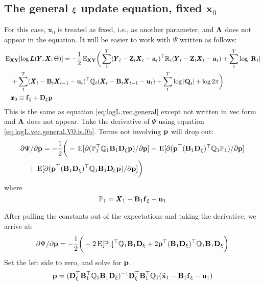 \documentclass[]{article}
\def\xixi{\mbox{\boldmath $\xi$}}
\def\LAM{\mbox{\boldmath $\Lambda$}}
\def\ZZ{\mbox{$\mathbf Z$}}	\def\zz{\mbox{$\mathbf z$}}
\def\BB{\mbox{$\mathbf B$}}	\def\bb{\mbox{$\mathbf b$}}
\def\DD{\mbox{$\mathbf D$}}	\def\dd{\mbox{$\mathbf d$}}
\def\QQ{\mbox{$\mathbf Q$}}	 \def\qq{\mbox{$\mathbf q$}}
\def\RR{\mbox{$\mathbf R$}}	 \def\rr{\mbox{$\mathbf r$}}
\def\XX{\mbox{$\pmb{X}$}}	\def\xx{\mbox{$\pmb{x}$}}
\def\YY{\mbox{$\pmb{Y}$}}	\def\yy{\mbox{$\pmb{y}$}}
\def\LL{\mbox{$\pmb{L}$}}	\def\ll{\mbox{$\pmb{l}$}}
\def\E{\,\textup{\textrm{E}}}
\def\EXy{\,\textup{\textrm{E}}_{\text{{\bf XY}}}}
\def\hatxone{\widetilde{\mbox{$\mathbf x$}}_1}
\begin{document}
\subsection{The general $\xixi$ update equation, fixed $\xx_0$}\label{sec:xi.constrained.x0}
For this case, $\xx_0$ is treated as fixed, i.e., as another parameter, and $\LAM$ does not appear in the equation. It will be easier to work with $\Psi$ written as follows:
\begin{equation}\label{eq:logL.vec.general.V0.is.0b}
\begin{split}
&\EXy[\log\LL(\YY,\XX ; \Theta)] = -\frac{1}{2}\EXy\bigg(
 \sum_1^T(\YY_t - \ZZ_t\XX_t - \aa_t)^\top \Rm_t(\YY_t - \ZZ_t\XX_t - \aa_t)
 +\sum_1^T \log |\RR_t|\\
&\quad +\sum_1^T(\XX_t - \BB_t\XX_{t-1} - \uu_t)^\top \Qm_t (\XX_t - \BB_t\XX_{t-1} - \uu_t)
 +\sum_1^T\log |\QQ_t| + \log 2\pi\bigg)\\
&\quad \xx_0 \equiv \ff_\xi+\DD_\xi\pp  
\end{split}
\end{equation}
This is the same as equation \ref{eq:logL.vec.general} except not written in vec form and $\LAM$ does not appear.  Take the derivative of $\Psi$ using equation \ref{eq:logL.vec.general.V0.is.0b}. Terms not involving $\mbox{$\mathbf p$}$ will drop out:
\begin{equation}\label{eq:pi.constrained.V0.is.0}
\begin{split}
&\partial\Psi/\partial\pp = -\frac{1}{2} \bigg( -\E[\partial(\mathbb{P}_1^\top\Qm_1\BB_1\DD_\xi\pp)/\partial\pp]  -\E[\partial(\pp^\top(\BB_1\DD_\xi)^\top\Qm_1\mathbb{P}_1)/\partial\pp] \\
&\quad +\E[\partial(\pp^\top(\BB_1\DD_\xi)^\top\Qm_1\BB_1\DD_\xi\pp)/\partial\pp]  
\bigg)
\end{split}
\end{equation}
where
\begin{equation}
\mathbb{P}_1=\XX_1 - \BB_1\ff_\xi  - \uu_1
\end{equation}

After pulling the constants out of the expectations and taking the derivative, we arrive at:
\begin{equation}
\begin{split}
\partial\Psi/\partial\pp = -\frac{1}{2} \bigg( - 2\E[\mathbb{P}_1]^\top\Qm_1\BB_1\DD_\xi
+ 2\pp^\top(\BB_1\DD_\xi)^\top\Qm_1\BB_1\DD_\xi  
\bigg)
\end{split}
\end{equation}
Set the left side to zero, and solve for $\mbox{$\mathbf p$}$.
\begin{equation}\label{eq:pi.constrained.V0.is.0.4}
\pp = (\DD_\xi^\top\BB_1^\top\Qm_1\BB_1\DD_\xi)^{-1}\DD_\xi^\top\BB_1^\top\Qm_1(\hatxone - \BB_1\ff_\xi  - \uu_1)
\end{equation}
\end{document}
